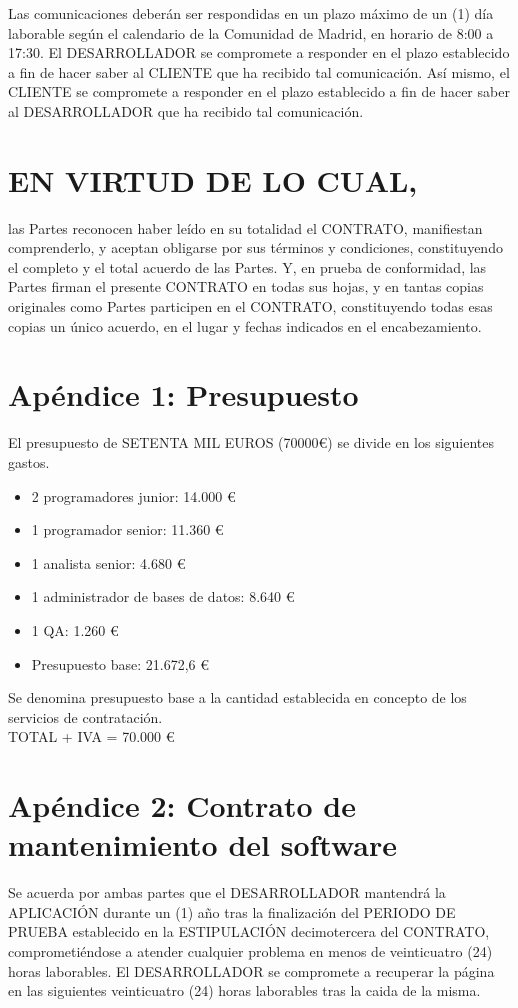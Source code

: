 \documentclass[a4paper,11pt]{report}
\begin{document}
    Las comunicaciones deberán ser respondidas en un plazo máximo de un (1) día laborable 
    según el calendario de la Comunidad de Madrid, en horario de 8:00 a 17:30. El DESARROLLADOR se compromete a responder en el plazo establecido a fin de hacer saber al
    CLIENTE que ha recibido tal comunicación. Así mismo, el CLIENTE se compromete a
    responder en el plazo establecido a fin de hacer saber al DESARROLLADOR que ha 
    recibido tal comunicación.

	\section*{EN VIRTUD DE LO CUAL,}
	las Partes reconocen haber leído en su totalidad el CONTRATO, manifiestan
	comprenderlo, y aceptan obligarse por sus términos y condiciones,
	constituyendo el completo y el total acuerdo de las Partes. Y, en prueba de
	conformidad, las Partes firman el presente CONTRATO en todas sus hojas, y en
	tantas copias originales como Partes participen en el CONTRATO, constituyendo
	todas esas copias un único acuerdo, en el lugar y fechas indicados en el
	encabezamiento.

	\newpage
	\section*{Apéndice 1: Presupuesto}\label{apen_presu}
    El presupuesto de SETENTA MIL EUROS (70000\euro) se divide en los siguientes gastos.
    \begin{itemize}
        \item 2 programadores junior: 14.000 \euro
        \item 1 programador senior: 11.360 \euro
        \item 1 analista senior: 4.680 \euro
        \item 1 administrador de bases de datos: 8.640 \euro
        \item 1 QA: 1.260 \euro
        \item Presupuesto base: 21.672,6 \euro
    \end{itemize}
    Se denomina presupuesto base a la cantidad establecida en concepto de los servicios de contratación.
    \\
    TOTAL + IVA = 70.000 \euro
	\section*{Apéndice 2: Contrato de mantenimiento del software}
	Se acuerda por ambas partes que el DESARROLLADOR mantendrá la APLICACIÓN
	durante un (1) año tras la finalización del PERIODO DE PRUEBA establecido en la
	ESTIPULACIÓN decimotercera del CONTRATO, comprometiéndose a atender	cualquier problema en menos de veinticuatro (24) horas laborables. El DESARROLLADOR se	compromete a recuperar la página en las siguientes veinticuatro (24) horas laborables tras
	la caida de la misma.
    
\end{document}
